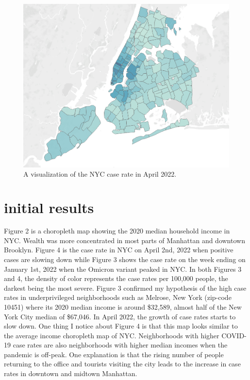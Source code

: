 \documentclass{vgtc}                 %
\begin{document}
\begin{figure}[tb]
 \centering %
 \includegraphics[width=\columnwidth]{Apr22.png}
 \caption{A visualization of the NYC case rate in April 2022.}
 \label{fig:sample}
\end{figure}

\section{initial results}
Figure 2 is a choropleth map showing the 2020 median household income in NYC. Wealth was more concentrated in most parts of Manhattan and downtown Brooklyn. Figure 4 is the case rate in NYC on April 2nd, 2022 when positive cases are slowing down while Figure 3 shows the case rate on the week ending on January 1st, 2022 when the Omicron variant peaked in NYC. In both Figures 3 and 4, the density of color represents the case rates per 100,000 people, the darkest being the most severe. Figure 3 confirmed my hypothesis of the high case rates in underprivileged neighborhoods such as Melrose, New York (zip-code 10451) where its 2020 median income is around \$32,589, almost half of the New York City median of \$67,046. In April 2022, the growth of case rates starts to slow down. One thing I notice about Figure 4 is that this map looks similar to the average income choropleth map of NYC. Neighborhoods with higher COVID-19 case rates are also neighborhoods with higher median incomes when the pandemic is off-peak. One explanation is that the rising number of people returning to the office and tourists visiting the city leads to the increase in case rates in downtown and midtown Manhattan.
\end{document}
